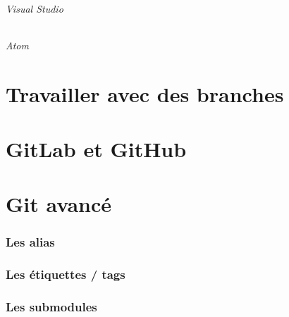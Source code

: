 \documentclass[10pt,a4paper]{article}
\begin{document}
\paragraph{Visual Studio}

\paragraph{Atom}

\part{Travailler avec des branches\label{branches}}

\part{GitLab et GitHub}

\part{Git avancé}

\section{Les alias\label{alias}}

\section{Les étiquettes / tags}

\section{Les submodules}
\end{document}
